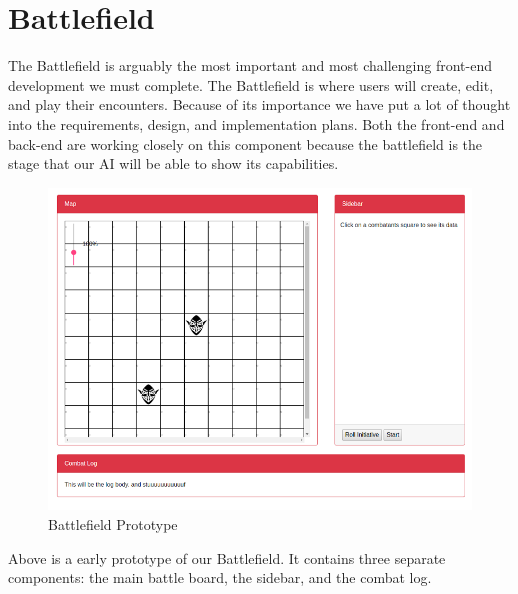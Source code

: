\documentclass[12pt,a4paper]{report}
\begin{document}
	\section{Battlefield}
The Battlefield is arguably the most important and most challenging front-end development we must complete. The Battlefield is where users will create, edit, and play their encounters. Because of its importance we have put a lot of thought into the requirements, design, and implementation plans. Both the front-end and back-end are working closely on this component because the battlefield is the stage that our AI will be able to show its capabilities.
\begin{figure}[H]
	\centering
	\includegraphics[scale=.5]{encountercreator}
	\caption{Battlefield Prototype}
	\label{fig: Battlefield Prototype}
\end{figure}
Above is a early prototype of our Battlefield. It contains three separate components: the main battle board, the sidebar, and the combat log. 
\end{document}
